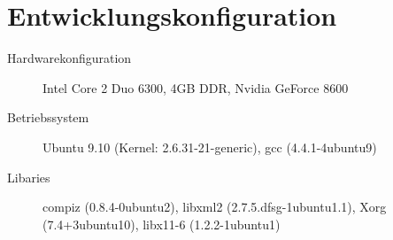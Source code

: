 \section{Entwicklungskonfiguration}
\label{sec:programmierhandbuch:konfig}
\begin{description}
\item[Hardwarekonfiguration] Intel Core 2 Duo 6300, 4GB DDR, Nvidia GeForce 8600
\item[Betriebssystem] Ubuntu 9.10 (Kernel: 2.6.31-21-generic), gcc (4.4.1-4ubuntu9)
\item[Libaries] compiz (0.8.4-0ubuntu2), libxml2 (2.7.5.dfsg-1ubuntu1.1), Xorg (7.4+3ubuntu10), libx11-6 (1.2.2-1ubuntu1)
\end{description}

